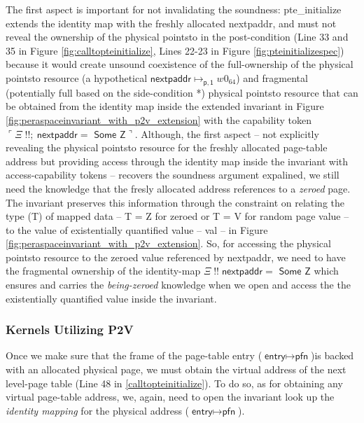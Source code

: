 The first aspect is important for not invalidating the soundness: \textsf{pte\_initialize} extends the identity map with the freshly allocated \textsf{nextpaddr}, and must not reveal the ownership of the physical pointsto in the post-condition (Line 33 and 35 in Figure \ref{fig:calltopteinitialize}, Lines 22-23 in Figure \ref{fig:pteinitializespec}) because it would create unsound coexistence of the full-ownership of the physical pointsto resource (a hypothetical $\mathsf{nextpaddr} \mapsto_{\mathsf{p,1}} w0_64$) and fragmental (potentially full based on the side-condition *) physical pointsto resource that can be obtained from the identity map inside the extended invariant in Figure \ref{fig:peraspaceinvariant_with_p2v_extension} with the capability token $\ulcorner \Xi \;!!;\ \textsf{nextpaddr} = \textsf{ Some Z} \urcorner$. Although, the first aspect -- not explicitly revealing the physical pointsto resource for the freshly allocated page-table address but providing access through the identity map inside the invariant with access-capability tokens -- recovers the soundness argument expalined, we still need the knowledge that the fresly allocated address references to a \textit{zeroed} page. The invariant preserves this information through the constraint on relating the type (\textsf{T}) of mapped data -- \textsf{T = Z} for zeroed or \textsf{T = V} for random page value -- to the value of existentially quantified value -- \textsf{val} -- in Figure \ref{fig:peraspaceinvariant_with_p2v_extension}. So, for accessing the physical pointsto resource to the zeroed value referenced by \textsf{nextpaddr}, we need to have the fragmental ownership of the identity-map $\Xi \; !! \; \textsf{nextpaddr} = \textsf{ Some Z}$ which ensures and carries the \textit{being-zeroed} knowledge when we open and access the the existentially quantified value inside the invariant.
  \subsubsection{Kernels Utilizing \textsf{P2V}}
  \label{sec:p2v}
 Once we make sure that the frame of the page-table entry ($\textsf{entry}\mapsto\textsf{pfn}$)is backed with an allocated physical page, we must obtain the virtual address of the next level-page table (Line 48 in \ref{calltopteinitialize}). To do so, as for obtaining any virtual page-table address, we, again, need to open the invariant look up the \textit{identity mapping} for the physical address ($\textsf{entry}\mapsto \textsf{pfn}$). 

